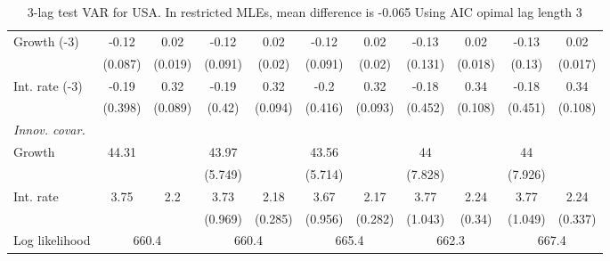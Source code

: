 \begin{table}[htbp]
\begin{tabular}{@{\extracolsep{4pt}}lcccccccccc@{}}
\quad Growth (-3) 	 &-0.12 	 & 0.02 	 & -0.12 	 & 0.02 	 & -0.12 	 & 0.02 	 & -0.13 	 & 0.02 	 & -0.13 	 & 0.02	 \\ 
 		 & (0.087) 	 & (0.019) 	 & (0.091) 	 & (0.02) 	 & (0.091) 	 & (0.02) 	 & (0.131) 	 & (0.018) 	 & (0.13) 	 & (0.017) 	 \\ 
\quad Int. rate (-3) 	 &-0.19 	 & 0.32 	 & -0.19 	 & 0.32 	 & -0.2 	 & 0.32 	 & -0.18 	 & 0.34 	 & -0.18 	 & 0.34	 \\ 
 		 & (0.398) 	 & (0.089) 	 & (0.42) 	 & (0.094) 	 & (0.416) 	 & (0.093) 	 & (0.452) 	 & (0.108) 	 & (0.451) 	 & (0.108) 	 \\ 
\rule{0pt}{4ex} \emph{Innov. covar.}  	 & 	 & 	 & 	 & 	 & 	 & 	 & 	 & 	 & 	 &\\ 
\quad Growth 	 &44.31 	 &  	 & 43.97 	 &  	 & 43.56 	 &  	 & 44 	 &  	 & 44 	 & 	 \\ 
 		 &  	 &  	 & (5.749) 	 &  	 & (5.714) 	 &  	 & (7.828) 	 &  	 & (7.926) 	 &  	 \\ 
\quad Int. rate 	 &3.75 	 & 2.2 	 & 3.73 	 & 2.18 	 & 3.67 	 & 2.17 	 & 3.77 	 & 2.24 	 & 3.77 	 & 2.24	 \\ 
 		 &  	 &  	 & (0.969) 	 & (0.285) 	 & (0.956) 	 & (0.282) 	 & (1.043) 	 & (0.34) 	 & (1.049) 	 & (0.337) 	 \\ 
 \hline \rule{0pt}{4ex} 
  Log likelihood 	 &\multicolumn{2}{c}{660.4} 	 & \multicolumn{2}{c}{660.4} 	 & \multicolumn{2}{c}{665.4} 	 & \multicolumn{2}{c}{662.3} 	 & \multicolumn{2}{c}{667.4}\\ 

 \hline 	\end{tabular}		\caption{3-lag test VAR for USA. In restricted MLEs, mean difference is -0.065 Using AIC opimal lag length 3}
		\label{tab:USAopt_}

\end{table}